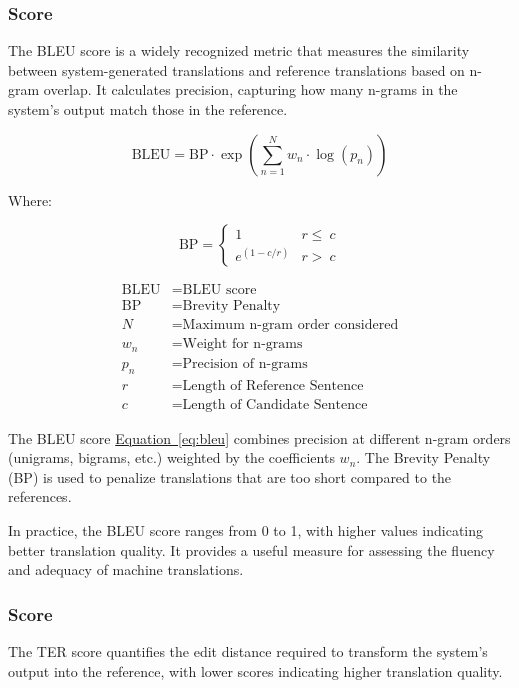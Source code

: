 \documentclass[12pt]{article}
\begin{document}
\subsubsection{\cite{bleu} Score}
The BLEU score is a widely recognized metric that measures the similarity between system-generated translations and reference translations based on n-gram overlap. It calculates precision, capturing how many n-grams in the system's output match those in the reference. 

\begin{equation}
	\label{eq:bleu}
	\text{BLEU} = \text{BP} \cdot \exp\left(\sum_{n=1}^{N} w_n \cdot \log(p_n)\right)
\end{equation}

Where:

\begin{equation*}
	\label{eq:brevity-penalty}
	\text{BP} =
	\begin{cases}
		1 & r \leq \ c \\
		e^{(1 - c / r)} & r > \ c
	\end{cases}
\end{equation*}


\begin{align*}
	\text{BLEU} & = \text{BLEU score} \\
	\text{BP} & = \text{Brevity Penalty} \\
	N & = \text{Maximum n-gram order considered} \\
	w_n & = \text{Weight for n-grams} \\
	p_n & = \text{Precision of n-grams}\\
	r & = \text{Length of Reference Sentence}\\
	c & = \text{Length of Candidate Sentence}
\end{align*}


The BLEU score \hyperref[eq:bleu]{Equation~\ref*{eq:bleu}} combines precision at different n-gram orders (unigrams, bigrams, etc.) weighted by the coefficients \(w_n\). The Brevity Penalty (BP) is used to penalize translations that are too short compared to the references.

In practice, the BLEU score ranges from 0 to 1, with higher values indicating better translation quality. It provides a useful measure for assessing the fluency and adequacy of machine translations.


\subsubsection{\cite{ter} Score}
The TER score quantifies the edit distance required to transform the system's output into the reference, with lower scores indicating higher translation quality.
\end{document}
